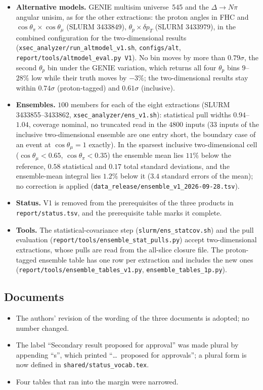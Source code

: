 \begin{itemize}\itemsep1pt
  \item \textbf{Alternative models.} GENIE multisim universe~545 and the $\Delta\to N\pi$ angular unisim,
    as for the other extractions: the proton angles in FHC and $\cos\theta_\pi\times\cos\theta_\mu$
    (SLURM 3433849), $\theta_p\times\delta p_T$ (SLURM 3433979), in the combined configuration for the
    two-dimensional results (\texttt{xsec\_analyzer/run\_altmodel\_v1.sh}, \texttt{configs/alt},
    \texttt{report/tools/altmodel\_eval.py V1}). No bin moves by more than $0.79\sigma$, the second
    $\theta_p$ bin under the GENIE variation, which returns all four $\theta_p$ bins $9$--$28\%$ low while
    their truth moves by $-3\%$; the two-dimensional results stay within $0.74\sigma$ (proton-tagged) and
    $0.61\sigma$ (inclusive).
  \item \textbf{Ensembles.} $100$ members for each of the eight extractions (SLURM 3433855--3433862,
    \texttt{xsec\_analyzer/ens\_v1.sh}): statistical pull widths $0.94$--$1.04$, coverage nominal, no
    truncated read in the $4800$ inputs ($33$ inputs of the inclusive two-dimensional ensemble are one
    entry short, the boundary case of an event at $\cos\theta_\mu=1$ exactly). In the sparsest inclusive two-dimensional cell
    ($\cos\theta_\mu<0.65$, $\cos\theta_\pi<0.35$) the ensemble mean lies $11\%$ below the reference,
    $0.58$ statistical and $0.17$ total standard deviations, and the ensemble-mean integral lies $1.2\%$
    below it ($3.4$ standard errors of the mean); no correction is applied
    (\texttt{data\_release/ensemble\_v1\_2026-09-28.tsv}).
  \item \textbf{Status.} V1 is removed from the prerequisites of the three products in
    \texttt{report/status.tsv}, and the prerequisite table marks it complete.
  \item \textbf{Tools.} The statistical-covariance step (\texttt{slurm/ens\_statcov.sh}) and the pull
    evaluation (\texttt{report/tools/ensemble\_stat\_pulls.py}) accept two-dimensional extractions, whose
    pulls are read from the all-slice closure file. The proton-tagged ensemble table has one row per
    extraction and includes the new ones (\texttt{report/tools/ensemble\_tables\_v1.py},
    \texttt{ensemble\_tables\_1p.py}).
\end{itemize}

\subsection{Documents}
\begin{itemize}\itemsep1pt
  \item The authors' revision of the wording of the three documents is adopted; no number changed.
  \item The label ``Secondary result proposed for approval'' was made plural by appending ``s'', which
    printed ``\ldots\ proposed for approvals''; a plural form is now defined in
    \texttt{shared/status\_vocab.tex}.
  \item Four tables that ran into the margin were narrowed.
\end{itemize}


